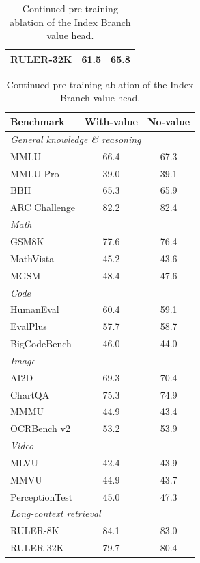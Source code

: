 \begin{table}[!htb]
\begin{minipage}[t]{0.48\textwidth}
\begin{tabular}{l c c}
RULER-32K                            & 61.5 & 65.8 \\
\bottomrule
\end{tabular}
\end{minipage}\hfill
\begin{minipage}[t]{0.46\textwidth}
\centering
\caption{Continued pre-training ablation of the Index Branch value head.}
\label{tab:idxval-ablation}
\small
\begin{tabular}{l c c}
\toprule
Benchmark & With-value & No-value \\
\midrule
\multicolumn{3}{l}{\textit{General knowledge \& reasoning}} \\
MMLU                                & 66.4 & 67.3 \\
MMLU-Pro                            & 39.0 & 39.1 \\
BBH                                 & 65.3 & 65.9 \\
ARC Challenge                       & 82.2 & 82.4 \\
\midrule
\multicolumn{3}{l}{\textit{Math}} \\
GSM8K                               & 77.6 & 76.4 \\
MathVista                           & 45.2  & 43.6  \\
MGSM                                & 48.4 & 47.6 \\
\midrule
\multicolumn{3}{l}{\textit{Code}} \\
HumanEval                           & 60.4 & 59.1 \\
EvalPlus                            & 57.7 & 58.7 \\
BigCodeBench                        & 46.0 & 44.0 \\
\midrule
\multicolumn{3}{l}{\textit{Image}} \\
AI2D                                & 69.3 & 70.4 \\
ChartQA                             & 75.3 & 74.9 \\
MMMU                                & 44.9 & 43.4 \\
OCRBench v2                         & 53.2 & 53.9 \\
\midrule
\multicolumn{3}{l}{\textit{Video}} \\
MLVU                                & 42.4 & 43.9 \\
MMVU                                & 44.9  & 43.7  \\
PerceptionTest                      & 45.0 & 47.3 \\
\midrule
\multicolumn{3}{l}{\textit{Long-context retrieval}} \\
RULER-8K                            & 84.1 & 83.0 \\
RULER-32K                           & 79.7 & 80.4 \\
\bottomrule
\end{tabular}
\end{minipage}
\end{table}


